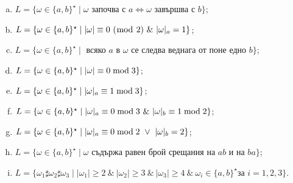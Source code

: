 {\begin{problem}
\begin{enumerate}[a)]
  \item
    $L = \{\omega \in \{a,b\}^\star \mid \omega\text{ започва с }a \iff \omega\text{ завършва с }b\}$;
  \item
    $L = \{\omega \in \{a,b\}^\star \mid \vert{\omega}\vert \equiv 0\ (\bmod\ 2)\ \&\ \vert{\omega}\vert_{a} = 1\}$;
  \item
    $L = \{\omega \in \{a,b\}^\star \mid \text{ всяко }a\text{ в }\omega\text{ се следва веднага от поне едно }b\}$;
  \item
    $L = \{\omega \in \{a,b\}^\star \mid \vert{\omega}\vert \equiv 0 \bmod 3\}$;
  \item
    $L = \{\omega \in \{a,b\}^\star \mid \vert{\omega}\vert_{a} \equiv 1 \bmod 3\}$;
  \item
    $L = \{\omega \in \{a,b\}^\star \mid \vert{\omega}\vert_{a} \equiv 0 \bmod 3\ \&\ \vert{\omega}\vert_{b} \equiv 1 \bmod 2\}$;
  \item
    $L = \{\omega \in \{a,b\}^\star \mid \vert{\omega}\vert_{a} \equiv 0 \bmod 2\ \vee\ \vert{\omega}\vert_{b} = 2\}$;
  \item
    $L = \{\omega \in \{a,b\}^\star \mid \omega \text{ съдържа равен брой срещания на }ab\text{ и на }ba\}$;
  \item
    $L = \{\omega_1 \sharp \omega_2 \sharp \omega_3 \mid |\omega_1| \geq 2\ \&\ |\omega_2| \geq 3\ \&\ |\omega_3| \geq 4\ \&\ \omega_i \in \{a,b\}^\star\text{
      за }i = 1,2,3\}$.
  \end{enumerate}
\end{problem}
}

